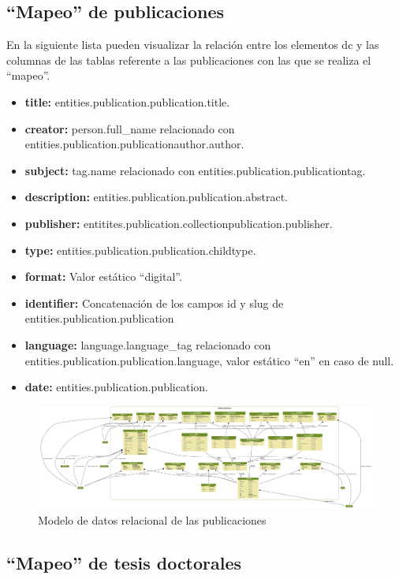 \subsection{``Mapeo'' de publicaciones}
En la siguiente lista pueden visualizar la relación entre los elementos \acrshort{dc} y las columnas de las tablas referente a las publicaciones con las que se realiza el ``mapeo''.

\begin{itemize}
	\item \textbf{title:} entities.publication.publication.title.
	\item \textbf{creator:} person.full\_name relacionado con entities.publication.publicationauthor.author.
	\item \textbf{subject:} tag.name relacionado con entities.publication.publicationtag.
	\item \textbf{description:} entities.publication.publication.abstract.
	\item \textbf{publisher:} entitites.publication.collectionpublication.publisher.
	\item \textbf{type:} entities.publication.publication.childtype.
	\item \textbf{format:} Valor estático ``digital''.
	\item \textbf{identifier:} Concatenación de los campos id y slug de entities.publication.publication
	\item \textbf{language:} language.language\_tag relacionado con entities.publication.publication.language, valor estático ``en'' en caso de null.
	\item \textbf{date:} entities.publication.publication.
\end{itemize}

\begin{figure}[!htbp]
	\centering
	\includegraphics[angle=90, scale=0.17]{fig/dbmodel/publications}
	\caption{Modelo de datos relacional de las publicaciones}
	\label{fig:publicationsmodel}
\end{figure}

\subsection{``Mapeo'' de tesis doctorales}

